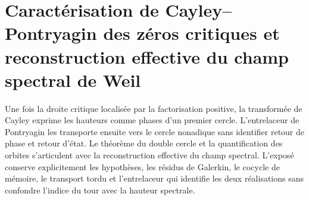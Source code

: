 \chapter{Caractérisation de Cayley–Pontryagin des zéros critiques et reconstruction effective du champ spectral de Weil}
\label{chap:hmt83-doble-circulo-campo-espectral}

Une fois la droite critique localisée par la factorisation positive, la transformée de Cayley exprime les hauteurs comme phases d’un premier cercle. L’entrelaceur de Pontryagin les transporte ensuite vers le cercle nonadique sans identifier retour de phase et retour d’état. Le théorème du double cercle et la quantification des orbites s’articulent avec la reconstruction effective du champ spectral. L’exposé conserve explicitement les hypothèses, les résidus de Galerkin, le cocycle de mémoire, le transport tordu et l’entrelaceur qui identifie les deux réalisations sans confondre l’indice du tour avec la hauteur spectrale.



